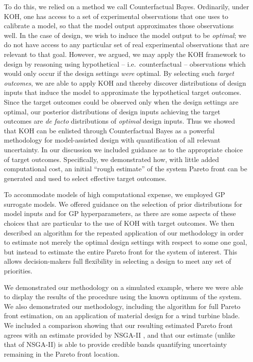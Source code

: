 \documentclass[12pt]{article}
\begin{document}
To do this, we relied on a method we call Counterfactual Bayes.
Ordinarily, under KOH, one has access to a set of experimental observations that one uses to calibrate a model, so that the model output approximates those observations well.
In the case of design, we wish to induce the model output to be \textit{optimal}; we do not have access to any particular set of real experimental observations that are relevant to that goal.
However, we argued, we may apply the KOH framework to design by reasoning using hypothetical -- i.e.\ counterfactual -- observations which would only occur if the design settings \textit{were} optimal.
By selecting such \textit{target outcomes}, we are able to apply KOH and thereby discover distributions of design inputs that induce the model to approximate the hypothetical target outcomes.
Since the target outcomes could be observed only when the design settings are optimal, our posterior distributions of design inputs achieving the target outcomes are \textit{de facto} distributions of \textit{optimal} design inputs.
Thus we showed that KOH can be enlisted through Counterfactual Bayes as a powerful methodology for model-assisted design with quantification of all relevant uncertainty.
In our discussion we included guidance as to the appropriate choice of target outcomes.
Specifically, we demonstrated how, with little added computational cost, an initial ``rough estimate'' of the system Pareto front can be generated and used to select effective target outcomes.

To accommodate models of high computational expense, we employed GP surrogate models.
We offered guidance on the selection of prior distributions for model inputs and for GP hyperparameters, as there are some aspects of these choices that are particular to the use of KOH with target outcomes.
We then described an algorithm for the repeated application of our methodology in order to estimate not merely the optimal design settings with respect to some one goal, but instead to estimate the entire Pareto front for the system of interest.
This allows decision-makers full flexibility in selecting a design to meet any set of priorities.

We demonstrated our methodology on a simulated example, where we were able to display the results of the procedure using the known optimum of the system.
We also demonstrated our methodology, including the algorithm for full Pareto front estimation, on an application of material design for a wind turbine blade.
We included a comparison showing that our resulting estimated Pareto front agrees with an estimate provided by NSGA-II \citep{Deb2002}, and that our estimate (unlike that of NSGA-II) is able to provide credible bands quantifying uncertainty remaining in the Pareto front location.
\end{document}
